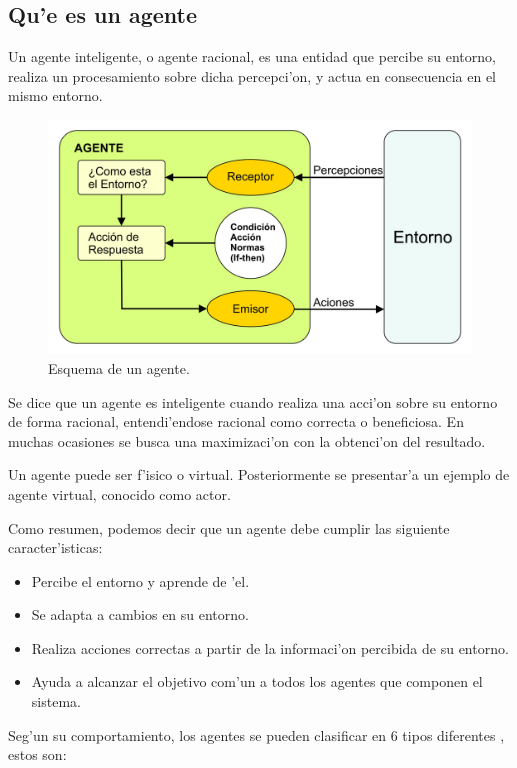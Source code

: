 \documentclass[12pt]{article}
\begin{document}
\subsection{Qu'e es un agente}
\label{sub:que es un agente}
Un agente inteligente, o agente racional, es una entidad que percibe su entorno, realiza
un procesamiento sobre dicha percepci'on, y actua en consecuencia en el mismo entorno.

\begin{figure}[h]
\centering
\includegraphics[scale=0.6]{agente}
\caption{Esquema de un agente.}
\end{figure}

Se dice que un agente es inteligente cuando realiza una acci'on sobre su entorno de forma racional,
entendi'endose racional como correcta o beneficiosa. En muchas ocasiones se busca una
maximizaci'on con la obtenci'on del resultado.

Un agente puede ser f'isico o virtual. Posteriormente se presentar'a un ejemplo de agente virtual,
conocido como actor.

Como resumen, podemos decir que un agente debe cumplir las siguiente caracter'isticas:

\begin{itemize}
	\item Percibe el entorno y aprende de 'el.
	\item Se adapta a cambios en su entorno.
	\item Realiza acciones correctas a partir de la informaci'on percibida de su entorno.
	\item Ayuda a alcanzar el objetivo com'un a todos los agentes que componen el sistema.
\end{itemize}

Seg'un su comportamiento, los agentes se pueden clasificar en 6 tipos diferentes \cite{kind-of-agents}, estos son:
\end{document}
